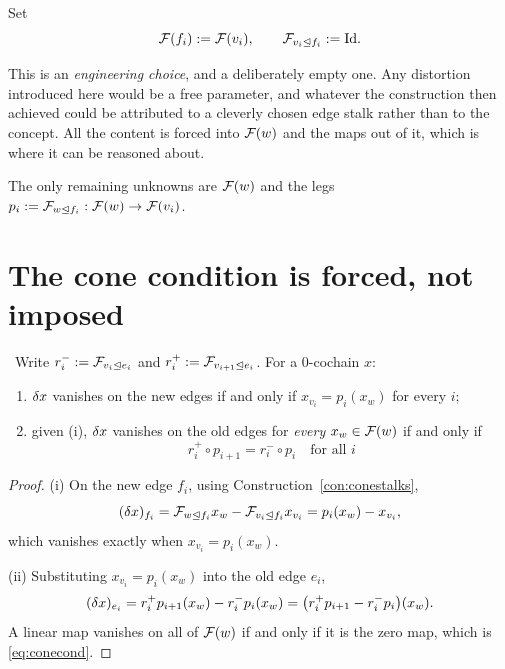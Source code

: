 \begin{construction}\label{con:conestalks}
Set
\[
  \mathcal{F}(f_i):=\mathcal{F}(v_i),
  \qquad
  \mathcal{F}_{v_i\trianglelefteq f_i}:=\mathrm{Id} .
\]
\end{construction}

\begin{hon}\Hon
This is an \emph{engineering choice}, and a deliberately empty one. Any
distortion introduced here would be a free parameter, and whatever the
construction then achieved could be attributed to a cleverly chosen edge
stalk rather than to the concept. All the content is forced into
$\mathcal{F}(w)$ and the maps out of it, which is where it can be reasoned
about.
\end{hon}

The only remaining unknowns are $\mathcal{F}(w)$ and the legs
$p_i:=\mathcal{F}_{w\trianglelefteq f_i}:\mathcal{F}(w)\to\mathcal{F}(v_i)$.

\section{The cone condition is forced, not imposed}

\begin{proposition}\label{prop:conecond}
\Proved\ Write $r_i^-:=\mathcal{F}_{v_i\trianglelefteq e_i}$ and
$r_i^+:=\mathcal{F}_{v_{i+1}\trianglelefteq e_i}$. For a $0$-cochain $x$:
\begin{enumerate}[label=(\roman*)]
  \item $\delta x$ vanishes on the new edges if and only if
        $x_{v_i}=p_i(x_w)$ for every $i$;
  \item given (i), $\delta x$ vanishes on the old edges for
        \emph{every} $x_w\in\mathcal{F}(w)$ if and only if
        \begin{equation}\label{eq:conecond}
          \boxed{\ r_i^+\circ p_{i+1}=r_i^-\circ p_i
          \quad\text{for all }i\ }
        \end{equation}
\end{enumerate}
\end{proposition}
\begin{proof}
(i) On the new edge $f_i$, using
Construction~\ref{con:conestalks},
\[
  (\delta x)_{f_i}
  =\mathcal{F}_{w\trianglelefteq f_i}x_w-\mathcal{F}_{v_i\trianglelefteq f_i}x_{v_i}
  =p_i(x_w)-x_{v_i},
\]
which vanishes exactly when $x_{v_i}=p_i(x_w)$.

(ii) Substituting $x_{v_i}=p_i(x_w)$ into the old edge $e_i$,
\[
  (\delta x)_{e_i}=r_i^+p_{i+1}(x_w)-r_i^-p_i(x_w)
  =\bigl(r_i^+p_{i+1}-r_i^-p_i\bigr)(x_w).
\]
A linear map vanishes on all of $\mathcal{F}(w)$ if and only if it is the
zero map, which is \eqref{eq:conecond}.
\end{proof}

